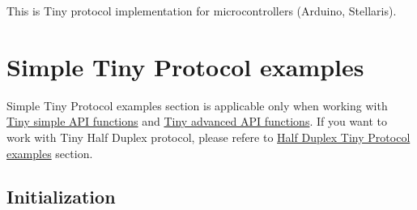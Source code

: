 This is Tiny protocol implementation for microcontrollers (Arduino, Stellaris).\hypertarget{arduino_arduino_tiny}{}\section{Simple Tiny Protocol examples}\label{arduino_arduino_tiny}
Simple Tiny Protocol examples section is applicable only when working with \hyperlink{group__SIMPLE__API}{Tiny simple A\+PI functions} and \hyperlink{group__ADVANCED__API}{Tiny advanced A\+PI functions}. If you want to work with Tiny Half Duplex protocol, please refere to \hyperlink{arduino_arduino_tiny_hd}{Half Duplex Tiny Protocol examples} section.\hypertarget{arduino_arduino_tiny_init}{}\subsection{Initialization}\label{arduino_arduino_tiny_init}

